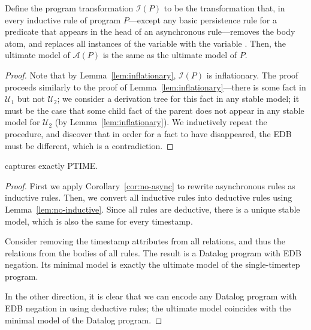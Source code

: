 \begin{lemma}
\label{lem:no-inductive}
Define the program transformation $\mathcal{I}(P)$ to be the transformation that, in every inductive rule of \slang program $P$---except any basic persistence rule for a predicate that appears in the head of an asynchronous rule---removes the  body atom, and replaces all instances of the variable  with the variable .  Then, the ultimate model of $\mathcal{A}(P)$ is the same as the ultimate model of $P$.
\end{lemma}
\begin{proof}
Note that by Lemma~\ref{lem:inflationary}, $\mathcal{I}(P)$ is inflationary.  The proof proceeds similarly to the proof of Lemma~\ref{lem:inflationary}---there is some fact in $\mathcal{U}_1$ but not $\mathcal{U}_2$; we consider a derivation tree for this fact in any stable model; it must be the case that some child fact of the parent does not appear in any stable model for $\mathcal{U}_2$ (by Lemma~\ref{lem:inflationary}).  We inductively repeat the procedure, and discover that in order for a fact to have disappeared, the EDB must be different, which is a contradiction.
\end{proof}


\begin{theorem}
\label{thm:ptime}
\slang captures exactly PTIME.
\end{theorem}
\begin{proof}
First we apply Corollary~\ref{cor:no-async} to rewrite asynchronous rules as inductive rules.  Then, we convert all inductive rules into deductive rules using Lemma~\ref{lem:no-inductive}.  Since all rules are deductive, there is a unique stable model, which is also the same for every timestamp.

Consider removing the timestamp attributes from all relations, and thus the  relations from the bodies of all rules.  The result is a Datalog program with EDB negation.  Its minimal model is exactly the ultimate model of the single-timestep \slang program.

In the other direction, it is clear that we can encode any Datalog program with EDB negation in \slang using deductive rules; the ultimate model coincides with the minimal model of the Datalog program.
\end{proof}



